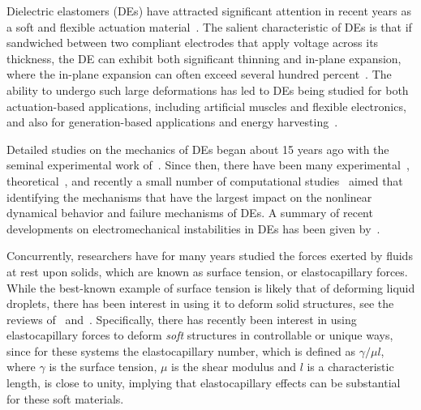 \documentclass[8.5pt,twoside,twocolumn]{article}
\begin{document}
Dielectric elastomers (DEs) have attracted significant attention in recent years as a soft and flexible actuation material~\citep{carpiSCIENCE2010,brochuMRC2010,biddissMEP2008}.  The salient characteristic of DEs is that if sandwiched between two compliant electrodes that apply voltage across its thickness, the DE can exhibit both significant thinning and in-plane expansion, where the in-plane expansion can often exceed several hundred percent~\citep{keplingerSM2012}.  The ability to undergo such large deformations has led to DEs being studied for both actuation-based applications, including artificial muscles and flexible electronics, and also for generation-based applications and energy harvesting~\citep{carpiSCIENCE2010,brochuMRC2010,mirMT2007}.

Detailed studies on the mechanics of DEs began about 15 years ago with the seminal experimental work of~\citet{pelrineSAA1998,pelrineSCIENCE2000}.  Since then, there have been many experimental~\citep{foxJMPS2008,keplingerPNAS2010,kofodJIMSS2003,kofodSAA2005,peiSPIE2004,planteIJSS2006,planteSAA2007,planteSMS2007,schlaakSPIE2005,wisslerSAA2007a,zhangSPIE2004,chibaSPIE2008,wangPRL2011a,wangAM2012,wangNC2012}, theoretical~\citep{suoJMPS2008,suoAMSS2010,goulbourneJAM2005,dorfmannAM2005,dorfmannJE2006,mcmeekingJAM2005,patrickSAA2007,planteSAA2007,planteSMS2007,wisslerSMS2005}, and recently a small number of computational studies~\citep{parkIJSS2012,parkSM2013,parkCMAME2013,zhouIJSS2008,zhaoAPL2007,vuIJNME2007,wisslerSMS2005,buschelIJNME2013,khanCM2013,henannJMPS2013,liSMS2012} aimed that identifying the mechanisms that have the largest impact on the nonlinear dynamical behavior and failure mechanisms of DEs.  A summary of recent developments on electromechanical instabilities in DEs has been given by~\citet{zhaoAPR2014}.  

Concurrently, researchers have for many years studied the forces exerted by fluids at rest upon solids, which are known as surface tension, or elastocapillary forces.  While the best-known example of surface tension is likely that of deforming liquid droplets, there has been interest in using it to deform solid structures, see the reviews of~\citet{romanJPCM2010} and~\citet{liuAMS2012}.  Specifically, there has recently been interest in using elastocapillary forces to deform \emph{soft} structures in controllable or unique ways, since for these systems the elastocapillary number, which is defined as $\gamma/\mu l$, where $\gamma$ is the surface tension, $\mu$ is the shear modulus and $l$ is a characteristic length, is close to unity, implying that elastocapillary effects can be substantial for these soft materials.  
\end{document}
